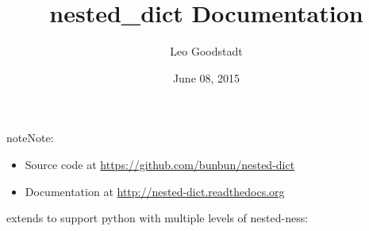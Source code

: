 \documentclass[letterpaper,10pt,english]{sphinxmanual}
\title{nested\_dict Documentation}
\date{June 08, 2015}
\author{Leo Goodstadt}
\begin{document}
\maketitle
\tableofcontents
{}\label{index::doc}
\begin{notice}{note}{Note:}\begin{itemize}
\item {} 
Source code at \href{https://github.com/bunbun/nested-dict}{https://github.com/bunbun/nested-dict}

\item {} 
Documentation at \href{http://nested-dict.readthedocs.org}{http://nested-dict.readthedocs.org}

\end{itemize}
\end{notice}



 extends  to support python  with multiple levels of nested-ness:
\end{document}

